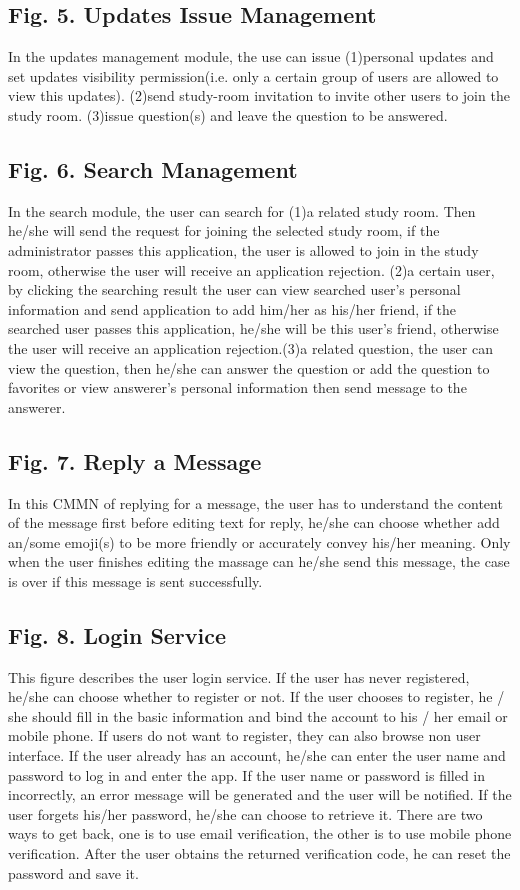 \documentclass[runningheads]{llncs}
\begin{document}
\subsection{Fig. 5. Updates Issue Management}
In the updates management module, the use can issue (1)personal updates and set updates visibility permission(i.e. only a certain group of users are allowed to view this updates). (2)send study-room invitation to invite other users to join the study room. (3)issue question(s) and leave the question to be answered. 
\subsection{Fig. 6. Search Management}
In the search module, the user can search for (1)a related study room. Then he/she will send the request for joining the selected study room, if the administrator passes this application, the user is allowed to join in the study room, otherwise the user will receive an application rejection. (2)a certain user, by clicking the searching result the user can view searched user’s personal information and send application to add him/her as his/her friend, if the searched user passes this application, he/she will be this user’s friend, otherwise the user will receive an application rejection.(3)a related question, the user can view the question, then he/she can answer the question or add the question to favorites or view answerer’s personal information then send message to the answerer.
\subsection{Fig. 7. Reply a Message}
In this CMMN of replying for a message, the user has to understand the content of the message first before editing text for reply, he/she can choose whether add an/some emoji(s) to be more friendly or accurately convey his/her meaning. Only when the user finishes editing the massage can he/she send this message, the case is over if this message is sent successfully.
\subsection{Fig. 8. Login Service}
This figure describes the user login service. If the user has never registered, he/she can choose whether to register or not. If the user chooses to register, he / she should fill in the basic information and bind the account to his / her email or mobile phone. If users do not want to register, they can also browse non user interface. If the user already has an account, he/she can enter the user name and password to log in and enter the app. If the user name or password is filled in incorrectly, an error message will be generated and the user will be notified. If the user forgets his/her password, he/she can choose to retrieve it. There are two ways to get back, one is to use email verification, the other is to use mobile phone verification. After the user obtains the returned verification code, he can reset the password and save it.
\end{document}
